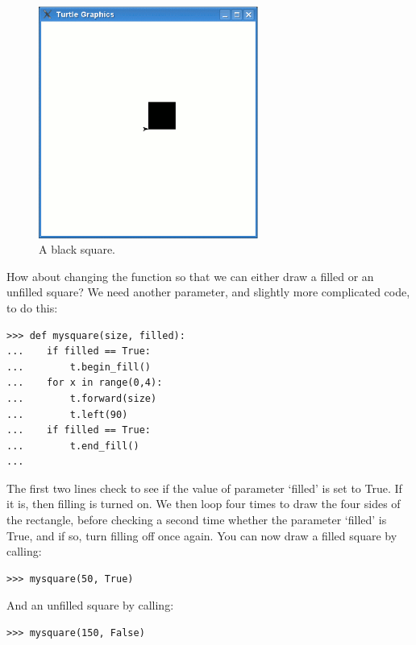 \begin{figure}
\begin{center}
\includegraphics[width=72mm]{eps/figure27.eps}
\end{center}
\caption{A black square.}\label{fig27}
\end{figure}

How about changing the function so that we can either draw a filled or an unfilled square? We need another parameter, and slightly more complicated code, to do this:

\begin{listing}
\begin{verbatim}
>>> def mysquare(size, filled):
...    if filled == True:
...        t.begin_fill()
...    for x in range(0,4):
...        t.forward(size)
...        t.left(90)
...    if filled == True:
...        t.end_fill()
...
\end{verbatim}
\end{listing}

The first two lines check to see if the value of parameter `filled' is set to True. If it is, then filling is turned on.  We then loop four times to draw the four sides of the rectangle, before checking a second time whether the parameter `filled' is True, and if so, turn filling off once again. You can now draw a filled square by calling:

\begin{listing}
\begin{verbatim}
>>> mysquare(50, True)
\end{verbatim}
\end{listing}

\noindent
And an unfilled square by calling:

\begin{listing}
\begin{verbatim}
>>> mysquare(150, False)
\end{verbatim}
\end{listing}

